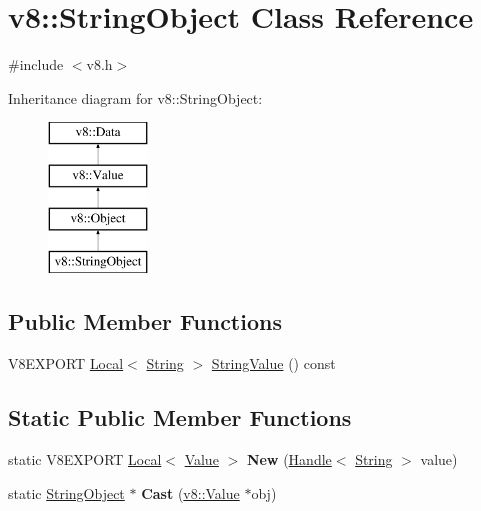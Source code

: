 \hypertarget{classv8_1_1_string_object}{}\section{v8\+:\+:String\+Object Class Reference}
\label{classv8_1_1_string_object}


{\ttfamily \#include $<$v8.\+h$>$}

Inheritance diagram for v8\+:\+:String\+Object\+:\begin{figure}[H]
\begin{center}
\leavevmode
\includegraphics[height=4.000000cm]{classv8_1_1_string_object}
\end{center}
\end{figure}
\subsection*{Public Member Functions}
\begin{DoxyCompactItemize}
\item 
V8\+E\+X\+P\+O\+R\+T \hyperlink{classv8_1_1_local}{Local}$<$ \hyperlink{classv8_1_1_string}{String} $>$ \hyperlink{classv8_1_1_string_object_abc51573fc5d4c01266a1ba8c522c6eab}{String\+Value} () const 
\end{DoxyCompactItemize}
\subsection*{Static Public Member Functions}
\begin{DoxyCompactItemize}
\item 
\hypertarget{classv8_1_1_string_object_a5c97e0af3f2d20cb433c1c286ed83781}{}static V8\+E\+X\+P\+O\+R\+T \hyperlink{classv8_1_1_local}{Local}$<$ \hyperlink{classv8_1_1_value}{Value} $>$ {\bfseries New} (\hyperlink{classv8_1_1_handle}{Handle}$<$ \hyperlink{classv8_1_1_string}{String} $>$ value)\label{classv8_1_1_string_object_a5c97e0af3f2d20cb433c1c286ed83781}

\item 
\hypertarget{classv8_1_1_string_object_af2169f0b4c890196416e4d28fbf76df8}{}static \hyperlink{classv8_1_1_string_object}{String\+Object} $\ast$ {\bfseries Cast} (\hyperlink{classv8_1_1_value}{v8\+::\+Value} $\ast$obj)\label{classv8_1_1_string_object_af2169f0b4c890196416e4d28fbf76df8}

\end{DoxyCompactItemize}


